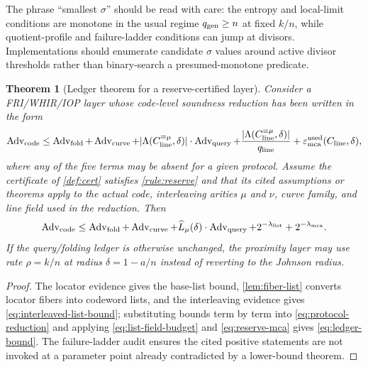 \documentclass[11pt]{article}
\newtheorem{theorem}{Theorem}[section]
\theoremstyle{definition}
\newcommand{\qgen}{q_{\rm gen}}
\newcommand{\qline}{q_{\rm line}}
\newcommand{\Adv}{\operatorname{Adv}}
\newcommand{\Int}[2]{#1^{\equiv #2}}
\begin{document}
The phrase ``smallest $\sigma$'' should be read with care: the entropy and local-limit conditions are monotone in the usual regime $\qgen\ge n$ at fixed $k/n$, while quotient-profile and failure-ladder conditions can jump at divisors.  Implementations should enumerate candidate $\sigma$ values around active divisor thresholds rather than binary-search a presumed-monotone predicate.

\begin{theorem}[Ledger theorem for a reserve-certified layer]
\label{thm:ledger}
Consider a FRI/WHIR/IOP layer whose code-level soundness reduction has been written in the form
\begin{equation}
\label{eq:protocol-reduction}
        \Adv_{\rm code}
        \le
        \Adv_{\rm fold}
        +\Adv_{\rm curve}
        +|\Lambda(\Int{C_{\rm line}}{\mu},\delta)|\cdot\Adv_{\rm query}
        +\frac{|\Lambda(\Int{C_{\rm line}}{\mu},\delta)|}{\qline}
        +\varepsilon_{\rm mca}^{\rm used}(C_{\rm line},\delta),
\end{equation}
where any of the five terms may be absent for a given protocol.  Assume the certificate of \cref{def:cert} satisfies \cref{rule:reserve} and that its cited assumptions or theorems apply to the actual code, interleaving arities $\mu$ and $\nu$, curve family, and line field used in the reduction.  Then
\begin{equation}
\label{eq:ledger-bound}
        \Adv_{\rm code}
        \le
        \Adv_{\rm fold}
        +\Adv_{\rm curve}
        +\widehat L_{\mu}(\delta)\cdot\Adv_{\rm query}
        +2^{-\lambda_{\rm list}}
        +2^{-\lambda_{\rm mca}} .
\end{equation}
If the query/folding ledger is otherwise unchanged, the proximity layer may use rate $\rho=k/n$ at radius $\delta=1-a/n$ instead of reverting to the Johnson radius.
\end{theorem}

\begin{proof}
The locator evidence gives the base-list bound, \cref{lem:fiber-list} converts locator fibers into codeword lists, and the interleaving evidence gives \eqref{eq:interleaved-list-bound}; substituting bounds term by term into \eqref{eq:protocol-reduction} and applying \eqref{eq:list-field-budget} and \eqref{eq:reserve-mca} gives \eqref{eq:ledger-bound}.  The failure-ladder audit ensures the cited positive statements are not invoked at a parameter point already contradicted by a lower-bound theorem.
\end{proof}
\end{document}
